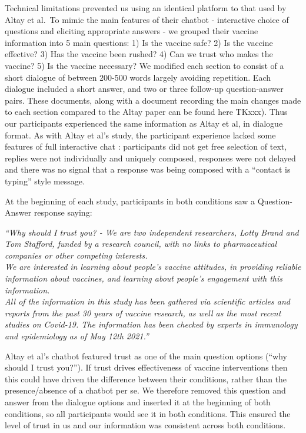 \documentclass[
  english,
  ,jou,floatsintext]{apa6}
\begin{document}
Technical limitations prevented us using an identical platform to that used by Altay et al.~To mimic the main features of their chatbot - interactive choice of questions and eliciting appropriate answers - we grouped their vaccine information into 5 main questions: 1) Is the vaccine safe? 2) Is the vaccine effective? 3) Has the vaccine been rushed? 4) Can we trust who makes the vaccine? 5) Is the vaccine necessary? We modified each section to consist of a short dialogue of between 200-500 words largely avoiding repetition. Each dialogue included a short answer, and two or three follow-up question-answer pairs. These documents, along with a document recording the main changes made to each section compared to the Altay paper can be found here TKxxx). Thus our participants experienced the same information as Altay et al, in dialogue format. As with Altay et al's study, the participant experience lacked some features of full interactive chat : participants did not get free selection of text, replies were not individually and uniquely composed, responses were not delayed and there was no signal that a response was being composed with a ``contact is typing'' style message.

At the beginning of each study, participants in both conditions saw a Question-Answer response saying:

\emph{``Why should I trust you? - We are two independent researchers, Lotty Brand and Tom Stafford, funded by a research council, with no links to pharmaceutical companies or other competing interests. }\\
\emph{We are interested in learning about people's vaccine attitudes, in providing reliable information about vaccines, and learning about people's engagement with this information. }\\
\emph{All of the information in this study has been gathered via scientific articles and reports from the past 30 years of vaccine research, as well as the most recent studies on Covid-19. The information has been checked by experts in immunology and epidemiology as of May 12th 2021.''}

Altay et al's chatbot featured trust as one of the main question options (``why should I trust you?''). If trust drives effectiveness of vaccine interventions then this could have driven the difference between their conditions, rather than the presence/absence of a chatbot per se. We therefore removed this question and answer from the dialogue options and inserted it at the beginning of both conditions, so all participants would see it in both conditions. This ensured the level of trust in us and our information was consistent across both conditions.
\end{document}
